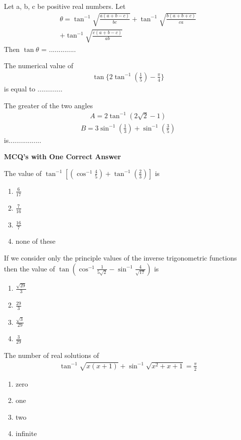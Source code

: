 \item Let a, b, c be positive real numbers. Let
\begin{align*}
\theta = \tan^{-1}\sqrt{\frac{a(a + b - c)}{bc}} + \tan^{-1} \sqrt{ \frac{b(a + b + c) }{ca}}\\ 
+ \tan^{-1}\sqrt{\frac{c(a +  b - c)}{ab}}
\end{align*}
Then $\tan \theta$ = ..............

\item The numerical value of 
\begin{align*}
\tan \{2\tan^{-1}(\frac{1}{5}) - \frac{\pi}{4}\}
\end{align*} 
is equal to .............

\item The greater of the two angles 
\begin{align*}
A = 2\tan^{-1}(2\sqrt{2} - 1)
\end{align*}
\begin{align*}
B = 3\sin^{-1}(\frac{1}{3}) + \sin^{-1}(\frac{3}{5})
\end{align*}
is.................

\textbf{MCQ's with One Correct Answer}

\item The value of $\tan^{-1}[(\cos^{-1}\frac{4}{5}) + \tan^{-1}(\frac{2}{3})]$ is
\begin{enumerate}
\item $\frac{6}{17}$
\item $\frac{7}{16}$
\item $\frac{16}{7}$
\item none of these
\end{enumerate}

\item If we consider only the principle values of the inverse trigonometric functions then the value of
$\tan(\cos^{-1}\frac{1}{5\sqrt{2}} - \sin^{-1}\frac{4}{\sqrt{17}})$ is
\begin{enumerate}
\item $\frac{\sqrt{29}}{3}$
\item $\frac{29}{3}$
\item $\frac{\sqrt{3}}{29}$
\item $\frac{3}{29}$
\end{enumerate}

\item The number of real solutions of 
\begin{align*}
\tan^{-1} \sqrt{x(x + 1)} + \sin^{-1} \sqrt{x^2 + x + 1} = \frac{\pi}{2}
\end{align*}
\begin{enumerate}
\item zero
\item one
\item two
\item infinite
\end{enumerate}

